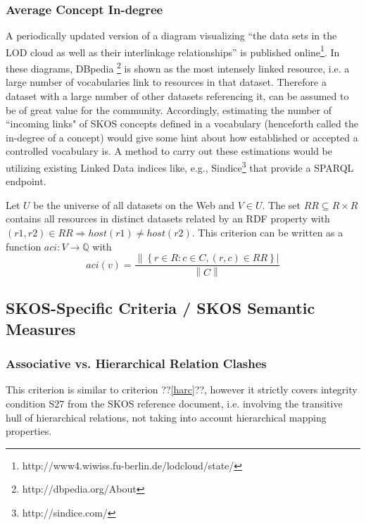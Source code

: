 \subsubsection{Average Concept In-degree} A periodically updated version of a diagram visualizing ``the data sets in the LOD cloud as well as their interlinkage relationships” is published online\footnote{http://www4.wiwiss.fu-berlin.de/lodcloud/state/}. In these diagrams, DBpedia \footnote{http://dbpedia.org/About} is shown as the most intensely linked resource, i.e. a large number of vocabularies link to resources in that dataset. Therefore a dataset with a large number of other datasets referencing it, can be assumed to be of great value for the community. Accordingly, estimating the number of ``incoming links" of SKOS concepts defined in a vocabulary (henceforth called the in-degree of a concept) would give some hint about how established or accepted a controlled vocabulary is. A method to carry out these estimations would be utilizing existing Linked Data indices like, e.g., Sindice\footnote{http://sindice.com/} that provide a SPARQL endpoint.

\begin{definition}
Let \(U\) be the universe of all datasets on the Web and \(V \in U\). The set \(RR \subseteq R \times R\) contains all resources in distinct datasets related by an RDF property with \((r1,r2) \in RR \Rightarrow host(r1) \neq host(r2)\). This criterion can be written as a function \(aci:V \rightarrow \mathbb{ℚ}\) with \[aci(v)=\frac{\left\|\left\{r \in R : c \in C, (r,c) \in RR\right\}\right|}{\left\|C\right\|}\] 
\end{definition}

\subsection{SKOS-Specific Criteria / SKOS Semantic Measures}
\subsubsection{Associative vs. Hierarchical Relation Clashes} This criterion is similar to criterion ??\ref{harc}??, however it strictly covers integrity condition S27 from the SKOS reference document, i.e. involving the transitive hull of hierarchical relations, not taking into account hierarchical mapping properties.


